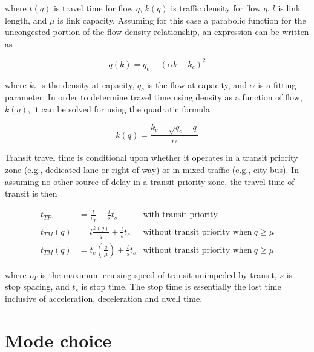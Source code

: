 \documentclass{article}
\begin{document}
\noindent where $t(q)$ is travel time for flow $q$, $k(q)$ is traffic density for flow $q$, $l$ is link length, and $\mu$ is link capacity. Assuming for this case a parabolic function for the uncongested portion of the flow-density relationship, an expression can be written as

\begin{equation}
    q(k) = q_c - (\alpha k - k_c)^2
\end{equation}

\noindent where $k_c$ is the density at capacity, $q_c$ is the flow at capacity, and $\alpha$ is a fitting parameter. In order to determine travel time using density as a function of flow, $k(q)$, it can be solved for using the quadratic formula

\begin{equation}
    k(q) = \frac{k_c - \sqrt{q_c - q}}{\alpha}
\end{equation}

Transit travel time is conditional upon whether it operates in a transit priority zone (e.g., dedicated lane or right-of-way) or in mixed-traffic (e.g., city bus). In assuming no other source of delay in a transit priority zone, the travel time of transit is then

\begin{subequations}
\begin{align}
    t_{TP} & = \frac{l}{v_T} + \frac{l}{s}t_s  & \text{with transit priority} \\
    t_{TM}(q) & = l\frac{k(q)}{q} + \frac{l}{s}t_s  & \text{without transit priority when}~q \geq \mu\\
    t_{TM}(q) & = t_c \left(\frac{q}{\mu}\right) + \frac{l}{s}t_s & \text{without transit priority when}~q \geq \mu
\end{align}
\end{subequations}

\noindent where $v_T$ is the maximum cruising speed of transit unimpeded by transit, $s$ is stop spacing, and $t_s$ is stop time. The stop time is essentially the lost time inclusive of acceleration, deceleration and dwell time.

\section{Mode choice}
\end{document}
